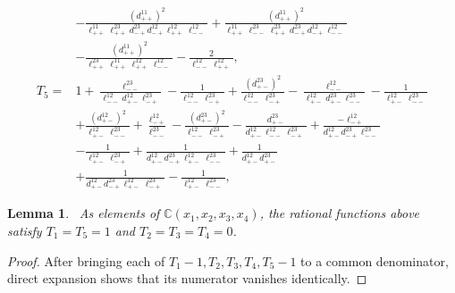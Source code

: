 \documentclass[a4,10pt]{amsart}
\numberwithin{equation}{section}
\newtheorem{Lemma}[Theorem]{Lemma}
\theoremstyle{definition}
\begin{document}
\begin{align*}
&-\frac{(d^{11}_{++})^2}
{\ell^{11}_{++}\ell^{23}_{++}d^{23}_{-+}d^{12}_{-+}
\ell^{12}_{++}\ell^{12}_{--}}
+\frac{(d^{11}_{++})^2}
{\ell^{11}_{++}\ell^{23}_{--}\ell^{23}_{++}d^{23}_{-+}
d^{12}_{-+}\ell^{12}_{--}}\\
&-\frac{(d^{11}_{++})^2}
{\ell^{23}_{++}\ell^{11}_{++}\ell^{12}_{++}\ell^{12}_{--}}
-\frac{2}
{\ell^{12}_{--}\ell^{12}_{++}},
\\[2mm]
T_5
=&1+\frac{\ell^{23}_{--}}
{\ell^{12}_{--}d^{12}_{+-}\ell^{23}_{-+}}
-\frac{1}
{\ell^{12}_{--}\ell^{23}_{-+}}
+\frac{(d^{23}_{+-})^2}
{\ell^{12}_{--}\ell^{23}_{-+}}
-\frac{\ell^{12}_{--}}
{\ell^{12}_{+-}d^{23}_{+-}\ell^{23}_{--}}
-\frac{1}
{\ell^{12}_{+-}\ell^{23}_{--}}\\ 
& +\frac{(d^{12}_{+-})^2}
{\ell^{12}_{+-}\ell^{23}_{--}}
+\frac{\ell^{12}_{-+}}
{\ell^{23}_{--}}-\frac{(d^{23}_{+-})^2}
{\ell^{12}_{--}\ell^{23}_{-+}}
-\frac{d^{23}_{+-}}
{d^{12}_{+-}\ell^{12}_{--}\ell^{23}_{-+}}
+\frac{-\ell^{12}_{-+}}
{d^{12}_{+-}d^{23}_{-+}\ell^{23}_{--}}\\
&-\frac{1}
{\ell^{12}_{+-}\ell^{23}_{-+}}
+\frac{1}
{d^{12}_{+-}d^{23}_{-+}\ell^{12}_{+-}\ell^{23}_{--}}
+\frac{1}
{d^{12}_{+-}d^{23}_{+-}}\\
&+\frac{1}
{d^{12}_{+-}d^{23}_{-+}\ell^{12}_{+-}\ell^{23}_{-+}}
-\frac{1}
{\ell^{12}_{+-}\ell^{23}_{--}} ,
\end{align*}


\begin{Lemma}~\label{lem:unprimed-rational-identities}
As elements of $\mathbb C(x_1,x_2,x_3,x_4)$, the rational functions
above satisfy $
 T_1=T_5=1$ and $
 T_2=T_3=T_4=0$.
\end{Lemma}
\begin{proof}
After bringing each of
$
 T_1-1, T_2,  T_3,  T_4, T_5-1
$
to a common denominator, direct expansion shows that its numerator
vanishes identically. 
\end{proof}
\end{document}
